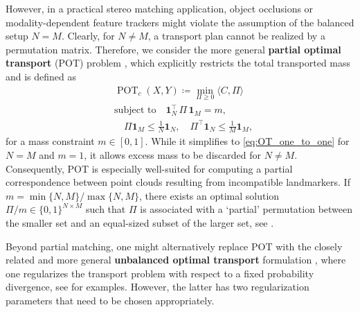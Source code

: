 \documentclass[10pt, twocolumn]{article}
\theoremstyle{definition}
\begin{document}
However, in a practical stereo matching application, 
object occlusions or modality-dependent feature trackers
might violate the assumption of the balanced setup $N = M$.
Clearly, for $N \not = M$, a transport plan cannot be realized by a permutation matrix.
Therefore, we consider the more general \textbf{partial optimal transport} (POT) problem \cite{caffarelli2010free, Chapel2020}, which explicitly restricts the total transported mass 
and is defined as
\begin{align} \label{eq:POT_matching}
&\operatorname{POT}_c(X,Y)
\coloneqq  \min_{\Pi \ge 0} \langle C, \Pi \rangle\\
& \text{subject to} \quad {\mathbf{1}_N^\top \, \Pi \, \mathbf{1}_M = m,}\\
&\quad 
\Pi \mathbf{1}_M \leq \frac1N {\mathbf{1}_N} 
, \quad 
\Pi^\top \mathbf{1}_N \leq \frac1M { \mathbf{1}_M},
\end{align}
{for a mass constraint $m\in[0,1]$.}
While it simplifies to \eqref{eq:OT_one_to_one} for $N=M$ {and $m=1$}, it allows excess mass to be discarded for $N \neq M$. 
{Consequently, POT is especially well-suited for computing a partial correspondence between point clouds resulting from incompatible landmarkers.}
If $m={\min\{N, M\}}/{\max\{N, M\}}$,
there exists an optimal solution $\Pi/m \in \{0, 1\}^{N \times M}$ such that $\Pi$ is associated with a `partial' permutation between the smaller set and an equal-sized subset of the larger set, see \cite[Thm. 4.1]{bai2023sliced}.

Beyond partial matching, one might alternatively replace POT with the closely related and more general \textbf{unbalanced optimal transport} formulation \cite{beier2023unbalanced,sejourne2023unbalanced}, where one regularizes the transport problem with respect to a fixed probability divergence, see \cite[Appendix~A]{stein2025} for examples.
{However, the latter has two regularization parameters that need to be chosen appropriately.}
\end{document}
